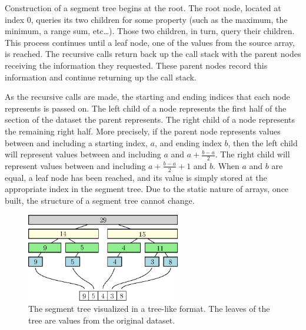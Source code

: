 Construction of a segment tree begins at the root.
The root node, located at index 0, queries its two children for some property (such as the maximum, the minimum, a range sum, etc\ldots).
Those two children, in turn, query their children.
This process continues until a leaf node, one of the values from the source array, is reached.
The recursive calls return back up the call stack with the parent nodes receiving the information they requested.
These parent nodes record this information and continue returning up the call stack.

As the recursive calls are made, the starting and ending indices that each node represents is passed on.
The left child of a node represents the first half of the section of the dataset the parent represents.
The right child of a node represents the remaining right half.
More precisely, if the parent node represents values between and including a starting index, $a$, and ending index $b$, then the left child will represent values between and including $a$ and $a + \frac{b - a}{2}$.
The right child will represent values between and including $a + \frac{b - a}{2} + 1$ and $b$.
When $a$ and $b$ are equal, a leaf node has been reached, and its value is simply stored at the appropriate index in the segment tree.
Due to the static nature of arrays, once built, the structure of a segment tree cannot change.

\begin{figure}[h]
    \centering
    \includegraphics[width=0.6\textwidth]{./structures/segment-tree/array-tree}
    \caption{\small The segment tree visualized in a tree-like format.
    The leaves of the tree are values from the original dataset.}
\end{figure}






